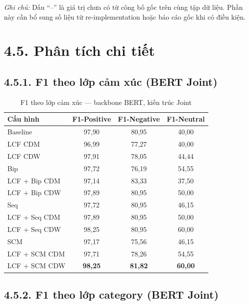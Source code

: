 \textit{Ghi chú:} Dấu ``--'' là giá trị chưa có từ công bố gốc trên
cùng tập dữ liệu. Phần này cần bổ sung số liệu từ re-implementation
hoặc báo cáo gốc khi có điều kiện.

\section{4.5.\; Phân tích chi tiết}
\label{sec:analysis}

\subsection{4.5.1.\; F1 theo lớp cảm xúc (BERT Joint)}

\begin{table}[H]
\centering
\small
\caption{F1 theo lớp cảm xúc — backbone BERT, kiến trúc Joint}
\label{tab:sentiment_perclass}
\begin{tabular}{@{}lccc@{}}
\toprule
\textbf{Cấu hình} & \textbf{F1-Positive} & \textbf{F1-Negative} & \textbf{F1-Neutral} \\
\midrule
Baseline               & 97,90 & 80,95 & 40,00 \\
LCF CDM                & 96,99 & 77,27 & 40,00 \\
LCF CDW                & 97,91 & 78,05 & 44,44 \\
Bip                    & 97,72 & 76,19 & 54,55 \\
LCF + Bip CDM          & 97,14 & 83,33 & 37,50 \\
LCF + Bip CDW          & 97,89 & 80,95 & 50,00 \\
Seq                    & 97,72 & 80,95 & 46,15 \\
LCF + Seq CDM          & 97,89 & 80,95 & 50,00 \\
LCF + Seq CDW          & 98,25 & 80,95 & 60,00 \\
SCM                   & 97,17 & 75,56 & 46,15 \\
LCF + SCM CDM         & 97,71 & 78,26 & 54,55 \\
LCF + SCM CDW         & \textbf{98,25} & \textbf{81,82} & \textbf{60,00} \\
\bottomrule
\end{tabular}
\end{table}

\subsection{4.5.2.\; F1 theo lớp category (BERT Joint)}

